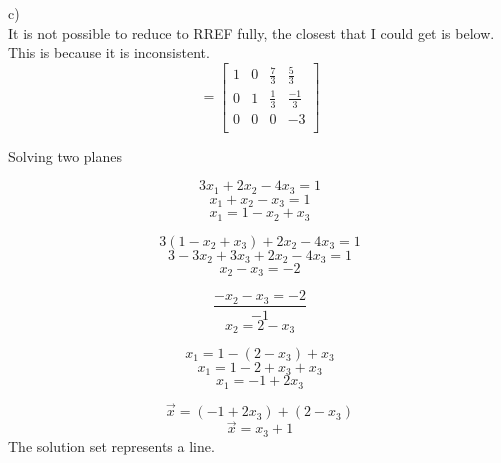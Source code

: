 \documentclass[12pt]{article}
\newenvironment{problem}[2][Problem]{\begin{trivlist}
\item[\hskip \labelsep {\bfseries #1}\hskip \labelsep {\bfseries #2.}]}{\end{trivlist}}
\begin{document}
c)\\
It is not possible to reduce to RREF fully, the closest that I could get is below.
This is because it is inconsistent.
	\[=
		\left[
		\begin{array}{ccc|c}
		1 & 0 & \frac{7}{3} & \frac{5}{3} \\
		0 & 1 & \frac{1}{3} & \frac{-1}{3}\\
		0 & 0 & 0 & -3\\
		\end{array}
		\right]
	\]
\begin{problem}{4}
	Solving two planes
\end{problem}
	\[3x_1 + 2x_2 -4x_3 = 1\]
	\[x_1 + x_2 - x_3 = 1\]
	\[x_1 = 1 - x_2 + x_3\]
	
	
	\[3(1 - x_2 + x_3) + 2x_2 - 4x_3 = 1\]
	\[3 - 3x_2 + 3x_3 + 2x_2 - 4x_3 = 1\]
	\[x_2 -x_3 = -2\]
	
	
	\[\frac{-x_2 -x_3 = -2}{-1}\]
	\[x_2 = 2 - x_3\]
	
	
	\[x_1 = 1 - (2 - x_3) + x_3\]
	\[x_1 = 1 - 2 + x_3 + x_3\]
	\[x_1 = -1 + 2x_3\]
	
	\[\vec x = (-1 + 2x_3) + (2 - x_3)\]
	\[\vec x = x_3 + 1\]
The solution set represents a line.
\end{document}
